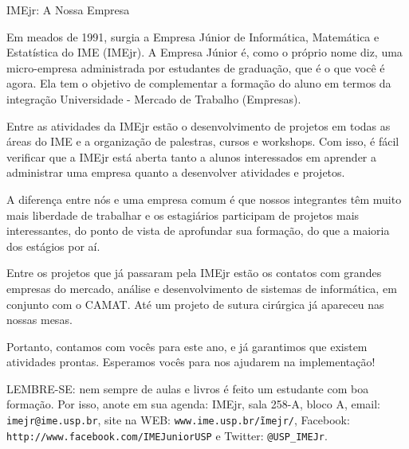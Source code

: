 \begin{secao}{IMEjr: A Nossa Empresa}

Em meados de 1991, surgia a Empresa Júnior de Informática, Matemática
e Estatística do IME (IMEjr). A Empresa Júnior é, como o próprio nome
diz, uma micro-empresa administrada por estudantes de graduação, que é
o que você é agora. Ela tem o objetivo de complementar a formação do
aluno em termos da integração Universidade - Mercado de Trabalho
(Empresas).

Entre as atividades da IMEjr estão o desenvolvimento de
projetos em todas as áreas do IME e a organização de palestras, cursos
e workshops. Com isso, é fácil verificar que a IMEjr está aberta tanto
a alunos interessados em aprender a administrar uma empresa quanto a
desenvolver atividades e projetos.

A diferença entre nós e uma
empresa comum é que nossos integrantes têm muito mais liberdade de
trabalhar e os estagiários participam de projetos mais interessantes,
do ponto de vista de aprofundar sua formação, do que a maioria dos
estágios por aí.

Entre os projetos que já passaram pela IMEjr estão
os contatos com grandes empresas do mercado, análise e desenvolvimento
de sistemas de informática, em conjunto com o CAMAT. Até um projeto
de sutura cirúrgica já apareceu nas nossas mesas.

Portanto, contamos
com vocês para este ano, e já garantimos que existem atividades
prontas. Esperamos vocês para nos ajudarem na implementação!

LEMBRE-SE: nem sempre de aulas e livros é feito um estudante com boa
formação. Por isso, anote em sua agenda: IMEjr, sala 258-A, bloco A,
email: {\tt imejr@ime.usp.br}, site na WEB:
{\tt www.ime.usp.br/\~imejr/}, Facebook: {\tt http://www.facebook.com/IMEJuniorUSP} e Twitter: {\tt @USP\_IMEJr}.

\end{secao}
